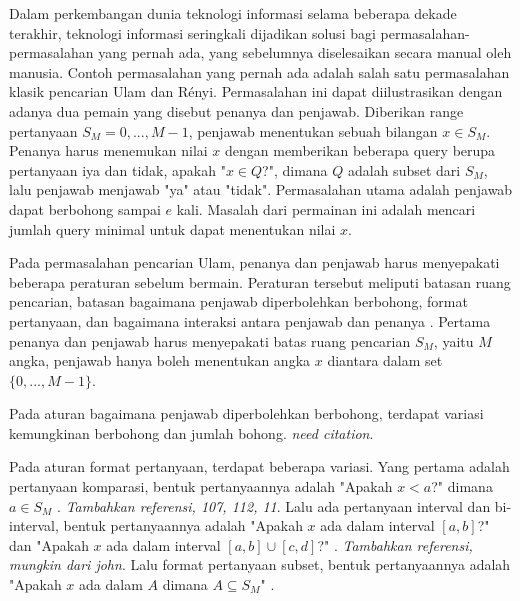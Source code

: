 \documentclass[conference,compsoc]{IEEEtran}
\begin{document}
Dalam perkembangan dunia teknologi informasi selama beberapa dekade terakhir, teknologi informasi seringkali dijadikan solusi bagi permasalahan-permasalahan yang pernah ada, yang sebelumnya diselesaikan secara manual oleh manusia. Contoh permasalahan yang pernah ada adalah salah satu permasalahan klasik pencarian Ulam dan Rényi. Permasalahan ini dapat diilustrasikan dengan adanya dua pemain yang disebut penanya dan penjawab. Diberikan range pertanyaan $S_M = {0,...,M-1}$, penjawab menentukan sebuah bilangan $x \in S_M$. Penanya harus menemukan nilai $x$ dengan memberikan beberapa query berupa pertanyaan iya dan tidak, apakah "$x \in Q$?", dimana $Q$ adalah subset dari $S_M$, lalu penjawab menjawab "ya" atau "tidak". Permasalahan utama adalah penjawab dapat berbohong sampai $e$ kali. Masalah dari permainan ini adalah mencari jumlah query minimal untuk dapat menentukan nilai $x$.


Pada permasalahan pencarian Ulam, penanya dan penjawab harus menyepakati beberapa peraturan sebelum bermain. Peraturan tersebut meliputi batasan ruang pencarian, batasan bagaimana penjawab diperbolehkan berbohong, format pertanyaan, dan bagaimana interaksi antara penjawab dan penanya \cite{Pelc2002}. Pertama penanya dan penjawab harus menyepakati batas ruang pencarian $S_M$, yaitu $M$ angka, penjawab hanya boleh menentukan angka $x$ diantara dalam set $\{0,...,M-1\}$.

Pada aturan bagaimana penjawab diperbolehkan berbohong, terdapat variasi kemungkinan berbohong dan jumlah bohong. \textit{need citation}.

Pada aturan format pertanyaan, terdapat beberapa variasi. Yang pertama adalah pertanyaan komparasi, bentuk pertanyaannya adalah "Apakah $x<a$?" dimana $a \in S_M$ \cite{Innes} \cite{Auletta1992}. \textit{Tambahkan referensi, 107, 112, 11}. Lalu ada pertanyaan interval dan bi-interval, bentuk pertanyaannya adalah "Apakah $x$ ada dalam interval $[a,b]$?" \cite{Peter2017} dan "Apakah $x$ ada dalam interval $[a,b] \cup [c,d]$?" \cite{Mundici1997}. \textit{Tambahkan referensi, mungkin dari john}. Lalu format pertanyaan subset, bentuk pertanyaannya adalah "Apakah $x$ ada dalam $A$ dimana $A \subseteq S_M$" \cite{Katona} \cite{Macula1997}.
\end{document}
